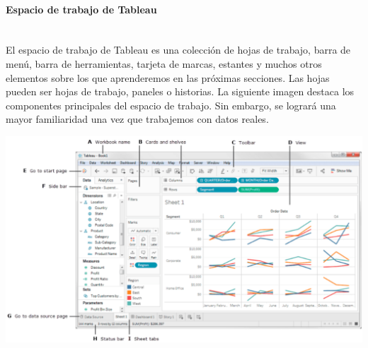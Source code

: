 \documentclass[12pt,letterpaper]{article}
\begin{document}
    \paragraph{\Large Espacio de trabajo de Tableau \\ \\}
    El espacio de trabajo de Tableau es una colección de hojas de trabajo, barra de menú, barra de herramientas, tarjeta de marcas, estantes y muchos otros elementos sobre los que aprenderemos en las próximas secciones. Las hojas pueden ser hojas de trabajo, paneles o historias. La siguiente imagen destaca los componentes principales del espacio de trabajo. Sin embargo, se logrará una mayor familiaridad una vez que trabajemos con datos reales.
    \begin{center}
        \includegraphics[width=16cm]{./img/img2.png}
    \end{center}
\end{document}

